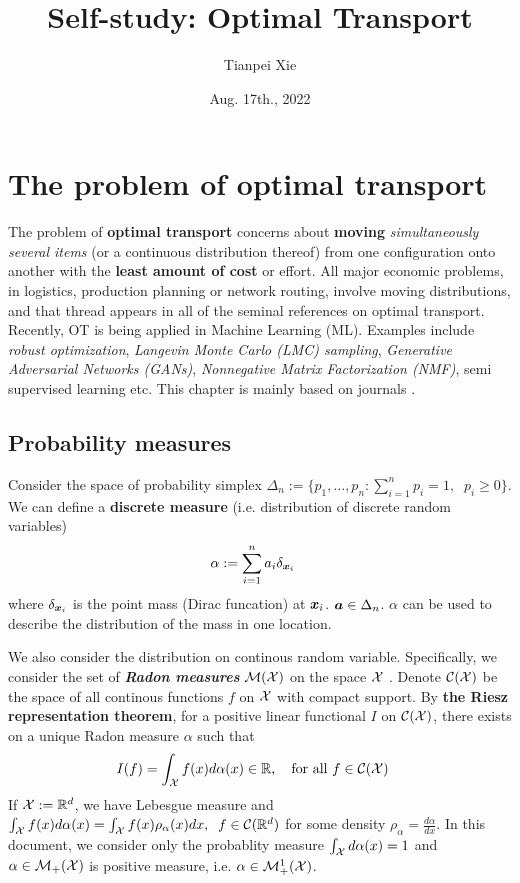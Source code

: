 \documentclass[11pt]{article}
\begin{document}
\title{Self-study: Optimal Transport}
\author{ Tianpei Xie}
\date{Aug. 17th., 2022}
\maketitle
\tableofcontents
\newpage
\section{The problem of optimal transport}
The problem of \textbf{optimal transport} concerns about \textbf{moving} \emph{simultaneously several items} (or a continuous distribution
thereof) from one configuration onto another with the \textbf{least amount of cost} or effort. All major economic problems, in logistics, production planning or network
routing, involve moving distributions, and that thread appears in all of the seminal references on optimal transport.  Recently, OT is being applied in Machine Learning (ML). Examples include \emph{robust optimization}, \emph{Langevin Monte Carlo (LMC) sampling}, \emph{Generative Adversarial Networks (GANs)}, \emph{Nonnegative Matrix Factorization (NMF)}, semi supervised learning etc. This chapter is mainly based on journals \citep{gabriel2019computational}.

\subsection{Probability measures}
Consider the space of probability simplex $\Delta_{n}:= \{p_1, \ldots, p_n: \sum_{i=1}^{n}p_i = 1, \;\; p_i \ge 0\}$. We can define a \textbf{discrete measure} (i.e. distribution of discrete random variables)
\begin{align*}
\alpha &:= \sum_{i=1}^{n}a_i \delta_{\boldsymbol{x}_{i}}
\end{align*} where $\delta_{\boldsymbol{x}_{i}}$ is the point mass (Dirac funcation) at $\boldsymbol{x}_i$. $\boldsymbol{a} \in \Delta_{n}$. $\alpha$ can be used to describe the distribution of the mass in one location. 

We also consider the distribution on continous random variable. Specifically, we consider the set of \emph{\textbf{Radon measures}} ${\mathcal M}({\mathcal X})$ on the space ${\mathcal X}$ \citep{folland1999real}. Denote ${\mathcal C}({\mathcal X})$ be the space of all continous functions $f$ on ${\mathcal X}$ with compact support. By \textbf{the Riesz representation theorem}, for a positive linear functional $I$ on ${\mathcal C}({\mathcal X})$, there exists on a unique Radon measure $\alpha$ such that
\begin{align*}
I(f) &= \int_{{\mathcal X}} f(x) d\alpha(x) \in {\mathbb R},  \quad\text{for all }f \in {\mathcal C}({\mathcal X})
\end{align*} If ${\mathcal X} := {\mathbb R}^{d}$, we have Lebesgue measure and $\int_{{\mathcal X}} f(x) d\alpha(x)=\int_{{\mathcal X}} f(x) \rho_{\alpha}(x) dx,  \;\; f \in {\mathcal C}({\mathbb R}^{d}) $ for some density $\rho_{\alpha}= \frac{d\alpha}{dx}$. In this document, we consider only the probablity measure $\int_{{\mathcal X}} d\alpha(x) = 1$ and $\alpha \in {\mathcal M}_{+}({\mathcal X})$ is positive measure, i.e. $\alpha \in {\mathcal M}^{1}_{+}({\mathcal X})$.
\end{document}
